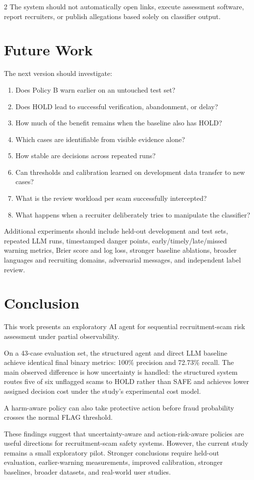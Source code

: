 \documentclass{article}
\newif\ifofficialijcai
\begin{document}
\begin{multicols}{2}
The system should not automatically open links, execute assessment software, report recruiters, or publish allegations based solely on classifier output.

\section{Future Work}

The next version should investigate:
\begin{enumerate}
    \item Does Policy B warn earlier on an untouched test set?
    \item Does HOLD lead to successful verification, abandonment, or delay?
    \item How much of the benefit remains when the baseline also has HOLD?
    \item Which cases are identifiable from visible evidence alone?
    \item How stable are decisions across repeated runs?
    \item Can thresholds and calibration learned on development data transfer to new cases?
    \item What is the review workload per scam successfully intercepted?
    \item What happens when a recruiter deliberately tries to manipulate the classifier?
\end{enumerate}

Additional experiments should include held-out development and test sets, repeated LLM runs, timestamped danger points, early/timely/late/missed warning metrics, Brier score and log loss, stronger baseline ablations, broader languages and recruiting domains, adversarial messages, and independent label review.

\section{Conclusion}

This work presents an exploratory AI agent for sequential recruitment-scam risk assessment under partial observability.

On a 43-case evaluation set, the structured agent and direct LLM baseline achieve identical final binary metrics: 100\% precision and 72.73\% recall. The main observed difference is how uncertainty is handled: the structured system routes five of six unflagged scams to HOLD rather than SAFE and achieves lower assigned decision cost under the study's experimental cost model.

A harm-aware policy can also take protective action before fraud probability crosses the normal FLAG threshold.

These findings suggest that uncertainty-aware and action-risk-aware policies are useful directions for recruitment-scam safety systems. However, the current study remains a small exploratory pilot. Stronger conclusions require held-out evaluation, earlier-warning measurements, improved calibration, stronger baselines, broader datasets, and real-world user studies.

\ifofficialijcai\else
\end{multicols}
\fi


\end{document}
